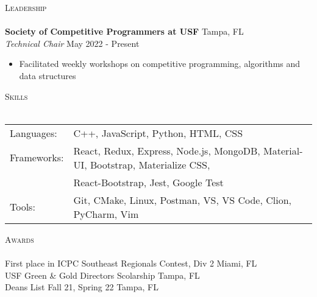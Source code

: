 \documentclass[a4paper]{article}
\newcommand{\lineunder} {
    \vspace*{-8pt} \\
    \hspace*{-18pt} \hrulefill \\
}
\newcommand{\header} [1] {
    {\hspace*{-18pt}\vspace*{6pt} \textsc{#1}}
    \vspace*{-6pt} \lineunder
}
\begin{document}
{\Large \header{Leadership}}
\vspace{1mm}
\textbf{Society of Competitive Programmers at USF} \hfill Tampa, FL\\
\textit{Technical Chair} \hfill May 2022 - Present\\
\vspace{-1mm}
\begin{itemize} \itemsep 1pt
    \item Facilitated weekly workshops on competitive programming, algorithms and data structures
\end{itemize}
{\Large \header{Skills}}
\vspace{1mm}
\begin{tabular}{ l l }
	Languages:  & C++, JavaScript, Python, HTML, CSS                                                 \\
	Frameworks: & React, Redux, Express, Node.js, MongoDB, Material-UI, Bootstrap, Materialize CSS,  \\
	            & React-Bootstrap, Jest, Google Test \\
	Tools:      & Git, CMake, Linux, Postman, VS, VS Code, Clion, PyCharm, Vim                                                 \\
\end{tabular}
\vspace{2mm}

{\Large \header{Awards}}
First place in ICPC Southeast Regionals Contest, Div 2 \hfill Miami, FL\\
USF Green \& Gold Directors Scolarship \hfill Tampa, FL\\
Dean\textquotesingle{}s List Fall 21, Spring 22 \hfill Tampa, FL\\
\ 
\end{document}
